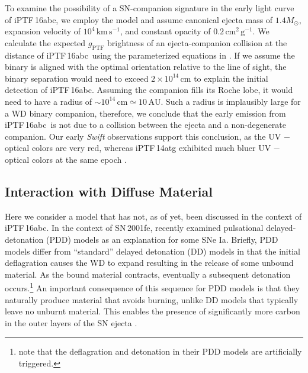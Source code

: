 \documentclass[twocolumn]{aastex61}
\newcommand{\sm}{M_\odot}
\newcommand{\abc}{iPTF\,16abc}
\newcommand{\amiller}[1]{{\color{blue} amiller: {#1}}}
\begin{document}
To examine the possibility of a SN-companion signature in the early
light curve of \abc, we employ the \citet{2010ApJ...708.1025K}
model and assume canonical ejecta mass of $1.4\sm$, expansion velocity of
$10^{4}\,\textrm{km}\,\textrm{s}^{-1}$, and constant opacity of
$0.2\,\textrm{cm}^2\,\textrm{g}^{-1}$. We calculate the expected 
$g_\mathrm{PTF}$ brightness of an ejecta-companion collision at the 
distance of \abc\ using the parameterized equations in 
\citet{2012ApJ...749...18B}. If we assume the binary is aligned with 
the optimal orientation relative to the line of sight, the binary 
separation would need to exceed $2\times10^{14}\,\textrm{cm}$ to 
explain the initial detection of \abc. Assuming the companion fills 
its Roche lobe, it would need to 
have a radius of $\sim10^{14}\,\textrm{cm}\simeq10 \,\mathrm{AU}$.
Such a radius is implausibly large for a WD binary companion, 
therefore, we conclude that the early emission from \abc\ is not 
due to a collision between the ejecta and a non-degenerate companion. Our early \textit{Swift} observations support this conclusion, as the UV $-$ optical colors are very red, whereas iPTF\,14atg exhibited much bluer UV $-$ optical colors at the same epoch \citep{2015Natur.521..328C}.


\subsection{Interaction with Diffuse Material}

Here we consider a model that has not, as of yet, been discussed in the context of \abc. In the context of SN\,2001fe, \citet{2014MNRAS.441..532D} recently examined pulsational delayed-detonation (PDD) models as an explanation for some SNe Ia. Briefly, PDD models differ from ``standard'' delayed detonation (DD) models in that the initial deflagration causes the WD to expand resulting in the release of some unbound material. As the bound material contracts, eventually a subsequent detonation occurs.\footnote{\citet{2014MNRAS.441..532D} note that the deflagration and detonation in their PDD models are artificially triggered.} An important consequence of this sequence for PDD models is that they naturally produce material that avoids burning, unlike DD models that typically leave no unburnt material. This enables the presence of significantly more carbon in the outer layers of the SN ejecta \citep{2014MNRAS.441..532D}.
\end{document}
